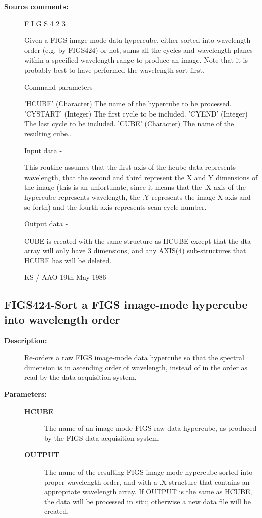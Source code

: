 \begin{description}
\begin{description}
\item [\textbf{Source comments:}]
\begin{terminalv}
 F I G S 4 2 3

 Given a FIGS image mode data hypercube, either sorted into
 wavelength order (e.g. by FIGS424) or not, sums all the cycles
 and wavelength planes within a specified wavelength range
 to produce an image.  Note that it is probably best to have
 performed the wavelength sort first.

 Command parameters -

 'HCUBE'    (Character) The name of the hypercube to be processed.
 'CYSTART'  (Integer) The first cycle to be included.
 'CYEND'    (Integer) The last cycle to be included.
 'CUBE'     (Character) The name of the resulting cube..

 Input data -

 This routine assumes that the first axis of the hcube data
 represents wavelength, that the second and third represent the
 X and Y dimensions of the image (this is an unfortunate,
 since it means that the .X axis of the hypercube represents
 wavelength, the .Y represents the image X axis and so forth)
 and the fourth axis represents scan cycle number.

 Output data -

 CUBE is created with the same structure as HCUBE
 except that the dta array will only have 3 dimensions, and any
 AXIS(4) sub-structures that HCUBE has will be deleted.

                                 KS / AAO 19th May 1986
\end{terminalv}
\end{description}
\subsection{FIGS424-\label{FIGS424}Sort a FIGS image-mode hypercube into wavelength order}
\begin{description}

\item [\textbf{Description:}]
 Re-orders a raw FIGS image-mode data hypercube so that the
 spectral dimension is in ascending order of wavelength,
 instead of in the order as read by the data acquisition system.

\item [\textbf{Parameters:}]
\begin{description}
\item [\textbf{HCUBE}]
 The name of an image mode FIGS raw data hypercube,
 as produced by the FIGS data acquisition system.
\item [\textbf{OUTPUT}]
 The name of the resulting FIGS image mode hypercube
 sorted into proper wavelength order, and with a .X
 structure that contains an appropriate wavelength
 array.  If OUTPUT is the same as HCUBE, the data
 will be processed in situ; otherwise a new data file
 will be created.
\end{description}


\end{description}
\end{description}
